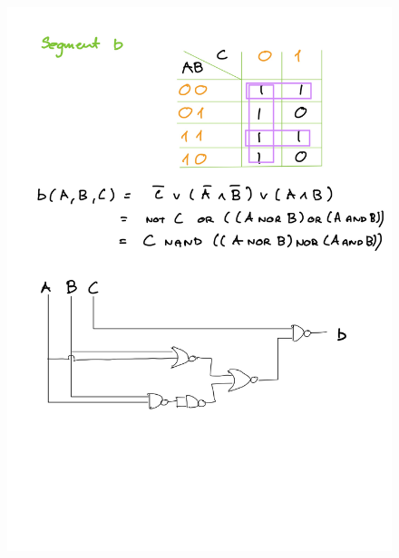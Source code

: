 \documentclass[14pt, table]{extarticle}
\begin{document}
\begin{figure}[H]
\includegraphics[scale=0.2]{Elektronika-23}
\centering
\captionsetup{labelformat=empty}
\caption{}
\end{figure}
\end{document}
